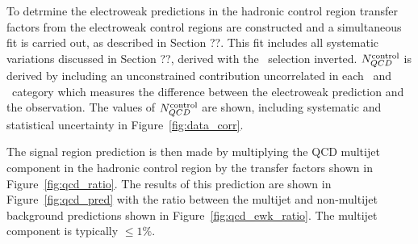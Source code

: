 To detrmine the electroweak predictions in the hadronic control region transfer factors 
from the \mhtmet electroweak control regions are constructed and a simultaneous
fit is carried out, as described in Section ??. This fit includes all systematic variations discussed in Section ??, derived with
the \mhtmet~selection inverted. $N_{QCD}^{\rm control}$ is derived by including an unconstrained
contribution uncorrelated in each \njet~and \scalht~category which measures the difference between 
the electroweak prediction and the observation. The values of $N_{QCD}^{\rm control}$ are shown, 
including systematic and statistical uncertainty in Figure~\ref{fig:data_corr}. 

The signal region prediction is then made by multiplying the QCD multijet component in the hadronic 
control region by the transfer factors shown in Figure~\ref{fig:qcd_ratio}. The results of this prediction
are shown in Figure~\ref{fig:qcd_pred} with the ratio between the multijet and non-multijet background
predictions shown in Figure~\ref{fig:qcd_ewk_ratio}. The multijet component is typically $\le 1\%$. 

